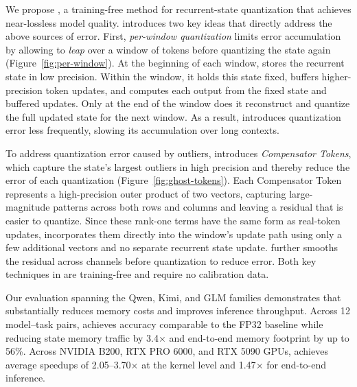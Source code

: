 We propose \emph{\sys{}}, a training-free method for recurrent-state quantization that achieves near-lossless model quality.
\sys{} introduces two key ideas that directly address the above sources of error.
First, \emph{per-window quantization} limits error accumulation by allowing \sys{} to \emph{leap} over a window of tokens before quantizing the state again (Figure~\ref{fig:per-window}).
At the beginning of each window, \sys{} stores the recurrent state in low precision.
Within the window, it holds this state fixed, buffers higher-precision token updates, and computes each output from the fixed state and buffered updates.
Only at the end of the window does it reconstruct and quantize the full updated state for the next window.
As a result, \sys{} introduces quantization error less frequently, slowing its accumulation over long contexts.

To address quantization error caused by outliers, \sys{} introduces \emph{Compensator Tokens}, which capture the state's largest outliers in high precision and thereby reduce the error of each quantization (Figure~\ref{fig:ghost-tokens}).
Each Compensator Token represents a high-precision outer product of two vectors, capturing large-magnitude patterns across both rows and columns and leaving a residual that is easier to quantize.
Since these rank-one terms have the same form as real-token updates, \sys{} incorporates them directly into the window's update path using only a few additional vectors and no separate recurrent state update.
\sys{} further smooths the residual across channels before quantization to reduce error.
Both key techniques in \sys{} are training-free and require no calibration data.

Our evaluation spanning the Qwen, Kimi, and GLM families demonstrates that \emph{\sys{}} substantially reduces memory costs and improves inference throughput.
Across 12 model--task pairs, \sys{} achieves accuracy comparable to the FP32 baseline while reducing state memory traffic by 3.4$\times$ and end-to-end memory footprint by up to 56\%.
Across NVIDIA B200, RTX PRO 6000, and RTX 5090 GPUs, \sys{} achieves average speedups of 2.05--3.70$\times$ at the kernel level and 1.47$\times$ for end-to-end inference.


